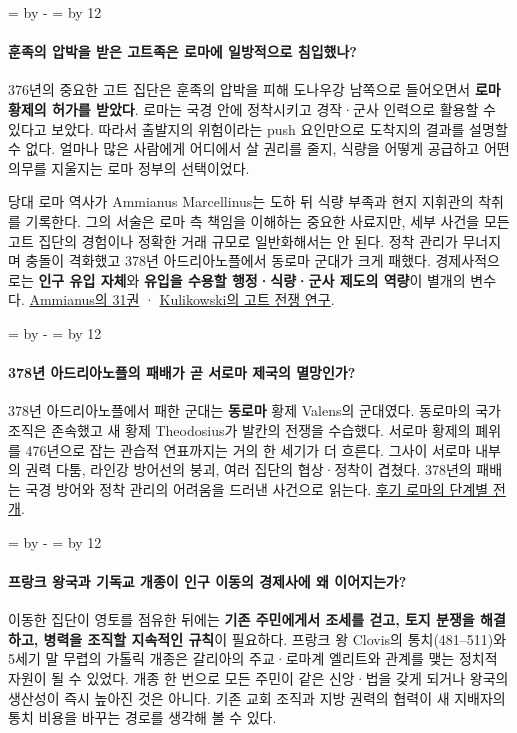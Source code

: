 \documentclass[10pt,a4paper]{article}
\newcommand{\ReserveQuestionSpace}{%
  \par\begingroup
  \dimen0=\pagegoal \advance\dimen0 by -\pagetotal
  \dimen2=\baselineskip \multiply\dimen2 by 12
  \ifdim\dimen0<\dimen2 \newpage\fi
  \endgroup}
\begin{document}
\ReserveQuestionSpace
\paragraph{훈족의 압박을 받은 고트족은 로마에 일방적으로 침입했나?}
376년의 중요한 고트 집단은 훈족의 압박을 피해 도나우강 남쪽으로 들어오면서 \textbf{로마 황제의 허가를 받았다}. 로마는 국경 안에 정착시키고 경작·군사 인력으로 활용할 수 있다고 보았다. 따라서 출발지의 위험이라는 push 요인만으로 도착지의 결과를 설명할 수 없다. 얼마나 많은 사람에게 어디에서 살 권리를 줄지, 식량을 어떻게 공급하고 어떤 의무를 지울지는 로마 정부의 선택이었다.\par

당대 로마 역사가 Ammianus Marcellinus는 도하 뒤 식량 부족과 현지 지휘관의 착취를 기록한다. 그의 서술은 로마 측 책임을 이해하는 중요한 사료지만, 세부 사건을 모든 고트 집단의 경험이나 정확한 거래 규모로 일반화해서는 안 된다. 정착 관리가 무너지며 충돌이 격화했고 378년 아드리아노플에서 동로마 군대가 크게 패했다. 경제사적으로는 \textbf{인구 유입 자체}와 \textbf{유입을 수용할 행정·식량·군사 제도의 역량}이 별개의 변수다. \href{https://www.tertullian.org/fathers/ammianus\_31\_book31.htm}{Ammianus의 31권} · \href{https://www.cambridge.org/core/books/abs/romes-gothic-wars/battle-of-adrianople/FD3BBABA661054B5662C6D20F4533776}{Kulikowski의 고트 전쟁 연구}.\par

\ReserveQuestionSpace
\paragraph{378년 아드리아노플의 패배가 곧 서로마 제국의 멸망인가?}
378년 아드리아노플에서 패한 군대는 \textbf{동로마} 황제 Valens의 군대였다. 동로마의 국가 조직은 존속했고 새 황제 Theodosius가 발칸의 전쟁을 수습했다. 서로마 황제의 폐위를 476년으로 잡는 관습적 연표까지는 거의 한 세기가 더 흐른다. 그사이 서로마 내부의 권력 다툼, 라인강 방어선의 붕괴, 여러 집단의 협상·정착이 겹쳤다. 378년의 패배는 국경 방어와 정착 관리의 어려움을 드러낸 사건으로 읽는다. \href{https://www.cambridge.org/core/books/cambridge-companion-to-the-age-of-attila/reversals-of-fortune-an-overview-of-the-age-of-attila/9F92FDDA3711527E2E1F8CBE681ECCCA}{후기 로마의 단계별 전개}.\par

\ReserveQuestionSpace
\paragraph{프랑크 왕국과 기독교 개종이 인구 이동의 경제사에 왜 이어지는가?}
이동한 집단이 영토를 점유한 뒤에는 \textbf{기존 주민에게서 조세를 걷고, 토지 분쟁을 해결하고, 병력을 조직할 지속적인 규칙}이 필요하다. 프랑크 왕 Clovis의 통치(481–511)와 5세기 말 무렵의 가톨릭 개종은 갈리아의 주교·로마계 엘리트와 관계를 맺는 정치적 자원이 될 수 있었다. 개종 한 번으로 모든 주민이 같은 신앙·법을 갖게 되거나 왕국의 생산성이 즉시 높아진 것은 아니다. 기존 교회 조직과 지방 권력의 협력이 새 지배자의 통치 비용을 바꾸는 경로를 생각해 볼 수 있다.\par
\end{document}
